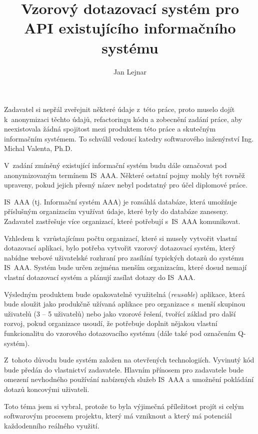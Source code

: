 \documentclass[thesis=M,czech]{FITthesis}[2019/12/23]
\title{Vzorový dotazovací systém pro API existujícího informačního systému}
\author{Jan Lejnar} %
\begin{document}

\begin{introduction}
Zadavatel si nepřál zveřejnit některé údaje z~této práce, proto muselo dojít k~anonymizaci těchto údajů, refactoringu kódu a zobecnění zadání práce, aby neexistovala žádná spojitost mezi produktem této práce a skutečným informačním systémem. To schválil vedoucí katedry softwarového inženýrství Ing. Michal Valenta, Ph.D.

V~zadání zmíněný existující informační systém budu dále označovat pod anonymizovaným termínem IS~AAA. Některé ostatní pojmy mohly být rovněž upraveny, pokud jejich přesný název nebyl podstatný pro účel diplomové práce.

IS~AAA (tj. Informační systém AAA) je rozsáhlá databáze, která umožňuje příslušným organizacím využívat údaje, které byly do databáze zaneseny. Zadavatel zastřešuje více organizací, které potřebují s~IS~AAA komunikovat.

Vzhledem k~vzrůstajícímu počtu organizací, které si musely vytvořit vlastní dotazovací aplikaci, bylo potřeba vytvořit vzorový dotazovací systém, který nabídne webové uživatelské rozhraní pro zasílání typických dotazů do systému IS~AAA. Systém bude určen zejména menším organizacím, které dosud nemají vlastní dotazovací systém a plánují zasílat dotazy do IS~AAA.

Výsledným produktem bude opakovatelně využitelná (\textit{reusable}) aplikace, která bude sloužit jako produkčně užívaná aplikace pro organizace s~menší skupinou uživatelů (3 -- 5 uživatelů) nebo jako vzorové řešení, tvořící základ pro další rozvoj, pokud organizace usoudí, že potřebuje doplnit nějakou vlastní funkcionalitu do vzorového dotazovacího systému (dále také pod označením Q-systém).

Z~tohoto důvodu bude systém založen na otevřených technologiích. Vyvinutý kód bude předán do vlastnictví zadavatele. Hlavním přínosem pro zadavatele bude omezení nevhodného používání nabízených služeb IS~AAA a umožnění pokládání dotazů koncovými uživateli.

\newpage
Toto téma jsem si vybral, protože to byla výjimečná příležitost projít si celým softwarovým procesem projektu, který má vzniknout  a který má potenciál každodenního reálného využití.
\end{introduction}
\end{document}
